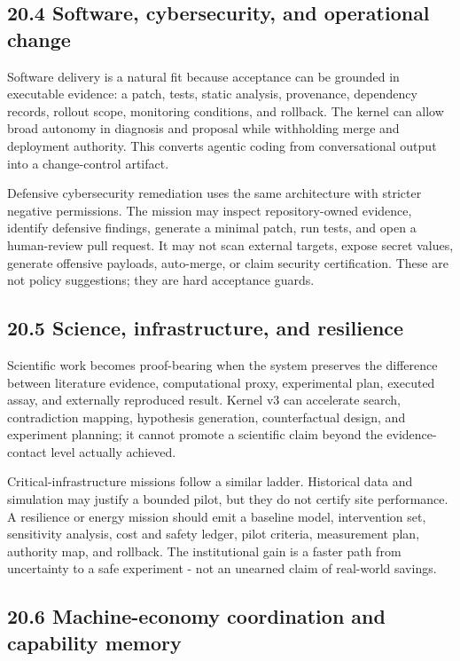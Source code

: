 \subsection{20.4 Software, cybersecurity, and operational
change}\label{software-cybersecurity-and-operational-change}

Software delivery is a natural fit because acceptance can be grounded in
executable evidence: a patch, tests, static analysis, provenance,
dependency records, rollout scope, monitoring conditions, and rollback.
The kernel can allow broad autonomy in diagnosis and proposal while
withholding merge and deployment authority. This converts agentic coding
from conversational output into a change-control artifact.

Defensive cybersecurity remediation uses the same architecture with
stricter negative permissions. The mission may inspect repository-owned
evidence, identify defensive findings, generate a minimal patch, run
tests, and open a human-review pull request. It may not scan external
targets, expose secret values, generate offensive payloads, auto-merge,
or claim security certification. These are not policy suggestions; they
are hard acceptance guards.

\subsection{20.5 Science, infrastructure, and
resilience}\label{science-infrastructure-and-resilience}

Scientific work becomes proof-bearing when the system preserves the
difference between literature evidence, computational proxy,
experimental plan, executed assay, and externally reproduced result.
Kernel v3 can accelerate search, contradiction mapping, hypothesis
generation, counterfactual design, and experiment planning; it cannot
promote a scientific claim beyond the evidence-contact level actually
achieved.

Critical-infrastructure missions follow a similar ladder. Historical
data and simulation may justify a bounded pilot, but they do not certify
site performance. A resilience or energy mission should emit a baseline
model, intervention set, sensitivity analysis, cost and safety ledger,
pilot criteria, measurement plan, authority map, and rollback. The
institutional gain is a faster path from uncertainty to a safe
experiment - not an unearned claim of real-world savings.

\subsection{20.6 Machine-economy coordination and capability
memory}\label{machine-economy-coordination-and-capability-memory}

